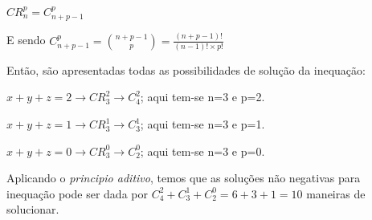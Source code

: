 \documentclass[12pt]{article}
\begin{document}
$CR_n^p = C_{n+p-1}^p$ \medskip

E sendo $\displaystyle C_{n+p-1}^p = \binom{n+p-1}{p} = \frac{(n+p-1)!}{(n-1)! \times p!}$

Então, são apresentadas todas as possibilidades de solução da inequação:

$x + y + z = 2 \rightarrow CR_3^2 \rightarrow C_4^2$; aqui tem-se n=3 e p=2.

$x + y + z = 1 \rightarrow CR_3^1 \rightarrow C_3^1$; aqui tem-se n=3 e p=1.

$x + y + z = 0 \rightarrow CR_3^0 \rightarrow C_2^0$; aqui tem-se n=3 e p=0. \medskip

Aplicando o \textit{principio aditivo}, temos que as soluções não negativas para inequação pode ser dada por $C_4^2 + C_3^1 + C_2^0 = 6 + 3 + 1 = 10$ maneiras de solucionar.



\end{document}
